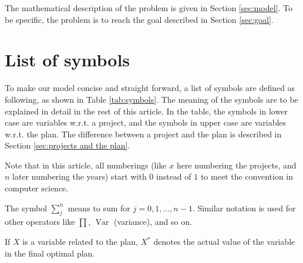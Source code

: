\documentclass{article}
\DeclareMathOperator*{\var}{Var}
\begin{document}

The mathematical description of the problem is given in Section \ref{sec:model}.
To be specific, the problem is to reach the goal described in Section \ref{sec:goal}.

\section{List of symbols}

To make our model concise and straight forward, a list of symbols are defined as following, as shown in Table \ref{tab:symbols}.
The meaning of the symbols are to be explained in detail in the rest of this article.
In the table, the symbols in lower case are variables w.r.t. a project,
and the symbols in upper case are variables w.r.t. the plan.
The difference between a project and the plan is described in Section \ref{sec:projects and the plan}.

Note that in this article, all numberings
(like $x$ here numbering the projects, and $n$ later numbering the years)
start with $0$ instead of $1$ to meet the convention in computer science.

The symbol $\sum_j^n$ means to sum for $j=0,1,\dots,n-1$.
Similar notation is used for other operators like $\prod$, $\var$ (variance), and so on.

If $X$ is a variable related to the plan, $X^*$ denotes the actual value of the variable in the final optimal plan.
\end{document}
